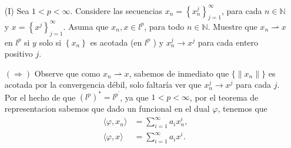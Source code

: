 \begin{itemize}
  \item[(I)] Sea $1<p<\infty$. Considere las secuencias $x_n=\left\{x_n^j\right\}_{j=1}^{\infty}$, para cada $n \in \mathbb{N}$ y $x=\left\{x^j\right\}_{j=1}^{\infty}$. Asuma que $x_n, x \in l^p$, para todo $n \in \mathbb{N}$.
  Muestre que $x_n \rightharpoonup x$ en $l^p$ si $y$ solo si $\left\{x_n\right\}$ es acotada (en $l^p$ ) y $ x_n^j \rightarrow x^j$ para cada entero positivo $j$.
  \begin{sproof}

    $(\Rightarrow)$ Observe que como $x_n\rightharpoonup x$, sabemos de inmediato que $\{\|x_n\|\}$ es acotada por la convergencia débil, solo faltaría ver que $x_n^j\to x^j$ para cada $j.$ Por el hecho de que $(l^p)^*=l^{p^\prime}$, ya que $1<p<\infty$, por el teorema de representacion sabemos que dado un funcional en el dual $\varphi$, tenemos que
    \begin{align*}
       \langle\varphi,x_n\rangle&=\sum_{i=1}^\infty a_ix_n^i,\\
       \langle\varphi,x\rangle&=\sum_{i=1}^\infty a_ix^i.
     \end{align*} 


\end{sproof}
\end{itemize}
